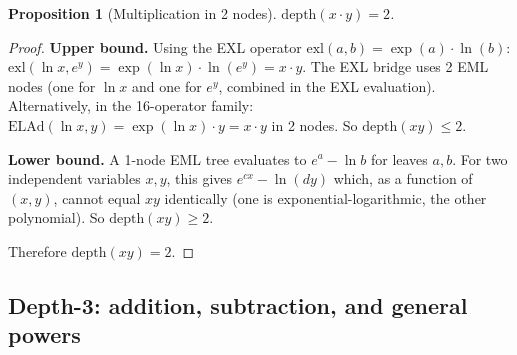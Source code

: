 \documentclass[12pt,a4paper]{article}
\newtheorem{proposition}[theorem]{Proposition}
\theoremstyle{definition}
\theoremstyle{remark}
\begin{document}
\begin{proposition}[Multiplication in 2 nodes]\label{prop:mul}
$\mathrm{depth}(x \cdot y) = 2$.
\end{proposition}
\begin{proof}
\textbf{Upper bound.}
Using the EXL operator $\mathrm{exl}(a,b) = \exp(a) \cdot \ln(b)$:
$\mathrm{exl}(\ln x, e^y) = \exp(\ln x) \cdot \ln(e^y) = x \cdot y$.
The EXL bridge uses 2 EML nodes (one for $\ln x$ and one for $e^y$, combined
in the EXL evaluation).  Alternatively, in the 16-operator family:
$\mathrm{ELAd}(\ln x, y) = \exp(\ln x) \cdot y = x \cdot y$ in 2 nodes.
So $\mathrm{depth}(xy) \leq 2$.

\textbf{Lower bound.}
A 1-node EML tree evaluates to $e^a - \ln b$ for leaves $a, b$.
For two independent variables $x, y$, this gives $e^{cx} - \ln(dy)$ which,
as a function of $(x,y)$, cannot equal $xy$ identically
(one is exponential-logarithmic, the other polynomial).
So $\mathrm{depth}(xy) \geq 2$.

Therefore $\mathrm{depth}(xy) = 2$.
\end{proof}

\subsection{Depth-3: addition, subtraction, and general powers}
\end{document}
